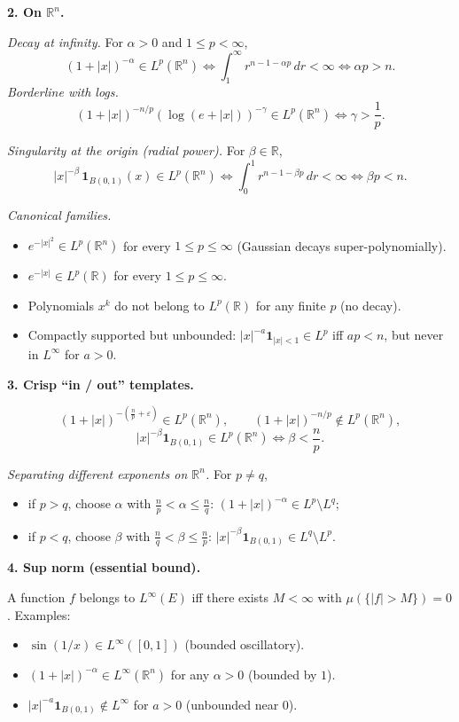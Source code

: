 \documentclass[12pt,a4paper]{article}
\theoremstyle{plain}
\theoremstyle{definition}
\theoremstyle{remark}
\theoremstyle{remark}
\theoremstyle{definition}
\begin{document}
	\bigskip
	\textbf{2. On $\mathbb{R}^n$.}
	
	\medskip
	\emph{Decay at infinity.}
	For $\alpha>0$ and $1\le p<\infty$,
	\[
	(1+|x|)^{-\alpha} \in L^p(\mathbb{R}^n)
	\iff \int_1^\infty r^{n-1-\alpha p}\,dr<\infty
	\iff \alpha p>n.
	\]
	\emph{Borderline with logs.}
	\[
	(1+|x|)^{-n/p}\!\left(\log(e+|x|)\right)^{-\gamma}\in L^p(\mathbb{R}^n)
	\iff \gamma>\frac1p.
	\]
	
	\medskip
	\emph{Singularity at the origin (radial power).}
	For $\beta\in\mathbb{R}$,
	\[
	|x|^{-\beta}\,\mathbf 1_{B(0,1)}(x)\in L^p(\mathbb{R}^n)
	\iff \int_0^1 r^{n-1-\beta p}\,dr<\infty
	\iff \beta p<n.
	\]
	
	\medskip
	\emph{Canonical families.}
	\begin{itemize}
		\item $e^{-|x|^2}\in L^p(\mathbb{R}^n)$ for every $1\le p\le\infty$ (Gaussian decays super-polynomially).
		\item $e^{-|x|}\in L^p(\mathbb{R})$ for every $1\le p\le\infty$.
		\item Polynomials $x^k$ do not belong to $L^p(\mathbb{R})$ for any finite $p$ (no decay).
		\item Compactly supported but unbounded:
		$|x|^{-a}\mathbf 1_{|x|<1}\in L^p$ iff $ap<n$, but never in $L^\infty$ for $a>0$.
	\end{itemize}
	
	\bigskip
	\textbf{3. Crisp ``in / out'' templates.}
	
	\medskip
	\[
	(1+|x|)^{-(\frac{n}{p}+\varepsilon)} \in L^p(\mathbb{R}^n),\qquad
	(1+|x|)^{-n/p} \notin L^p(\mathbb{R}^n),
	\]
	\[
	|x|^{-\beta}\mathbf 1_{B(0,1)} \in L^p(\mathbb{R}^n)\iff \beta<\frac{n}{p}.
	\]
	
	\medskip
	\emph{Separating different exponents on $\mathbb{R}^n$.}
	For $p\neq q$,
	\begin{itemize}
		\item if $p>q$, choose $\alpha$ with $\tfrac{n}{p}<\alpha\le \tfrac{n}{q}$:
		$(1+|x|)^{-\alpha}\in L^p\setminus L^q$;
		\item if $p<q$, choose $\beta$ with $\tfrac{n}{q}<\beta\le \tfrac{n}{p}$:
		$|x|^{-\beta}\mathbf 1_{B(0,1)}\in L^q\setminus L^p$.
	\end{itemize}
	
	\bigskip
	\textbf{4. Sup norm (essential bound).}
	
	\medskip
	A function $f$ belongs to $L^\infty(E)$ iff there exists $M<\infty$ with
	$\mu(\{|f|>M\})=0$.
	Examples:
	\begin{itemize}
		\item $\sin(1/x)\in L^\infty([0,1])$ (bounded oscillatory).
		\item $(1+|x|)^{-\alpha}\in L^\infty(\mathbb{R}^n)$ for any $\alpha>0$ (bounded by $1$).
		\item $|x|^{-a}\mathbf 1_{B(0,1)}\notin L^\infty$ for $a>0$ (unbounded near $0$).
	\end{itemize}
	
\end{document}
